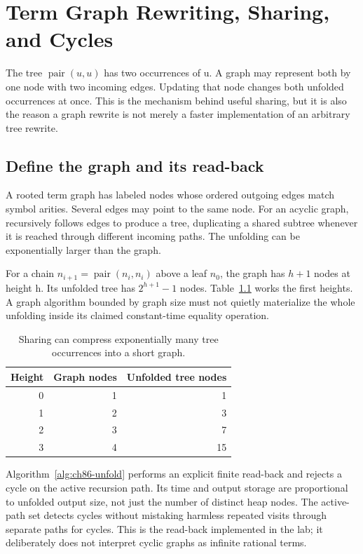 \chapter{Term Graph Rewriting, Sharing, and Cycles}
\label{ch:term-graph-rewriting}

The tree $\operatorname{pair}(u,u)$ has two occurrences of u.
A graph may represent both by one node with two incoming edges.
Updating that node changes both unfolded occurrences at once.
This is the mechanism behind useful sharing, but it is also the reason a graph rewrite is not merely a faster implementation of an arbitrary tree rewrite.

\section{Define the graph and its read-back}
\label{sec:ch86-graphs}
A rooted term graph has labeled nodes whose ordered outgoing edges match symbol arities.
Several edges may point to the same node.
For an acyclic graph,  recursively follows edges to produce a tree, duplicating a shared subtree whenever it is reached through different incoming paths.
The unfolding can be exponentially larger than the graph.

For a chain $n_{i+1}=\operatorname{pair}(n_i,n_i)$ above a leaf $n_0$, the graph has $h+1$ nodes at height h.
Its unfolded tree has $2^{h+1}-1$ nodes.
Table~\ref{tab:ch86-growth} works the first heights.
A graph algorithm bounded by graph size must not quietly materialize the whole unfolding inside its claimed constant-time equality operation.

\begin{table}[htbp]
\caption{Sharing can compress exponentially many tree occurrences into a short graph.}
\label{tab:ch86-growth}
\centering
\begin{tabular}{rrr}
\toprule
Height & Graph nodes & Unfolded tree nodes \\
\midrule
0 & 1 & 1 \\
1 & 2 & 3 \\
2 & 3 & 7 \\
3 & 4 & 15 \\
\bottomrule
\end{tabular}
\end{table}

Algorithm~\ref{alg:ch86-unfold} performs an explicit finite read-back and rejects a cycle on the active recursion path.
Its time and output storage are proportional to unfolded output size, not just the number of distinct heap nodes.
The active-path set detects cycles without mistaking harmless repeated visits through separate paths for cycles.
This is the read-back implemented in the lab; it deliberately does not interpret cyclic graphs as infinite rational terms.

